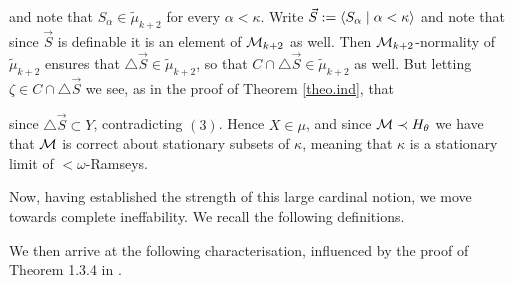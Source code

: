 \documentclass[../../main]{subfiles}
\begin{document}
{	and note that $S_\alpha\in\tilde\mu_{k+2}$ for every $\alpha<\kappa$. Write $\vec S:=\langle S_\alpha\mid\alpha<\kappa\rangle$ and note that since $\vec S$ is definable it is an element of $\operatorname{\mathcal M}_{k+2}$ as well. Then $\operatorname{\mathcal M}_{k+2}$-normality of $\tilde\mu_{k+2}$ ensures that $\triangle\vec S\in\tilde\mu_{k+2}$, so that $C\cap\triangle\vec S\in\tilde\mu_{k+2}$ as well. But letting $\zeta\in C\cap\triangle\vec S$ we see, as in the proof of Theorem \ref{theo.ind}, that

	since $\triangle\vec S\subset Y$, contradicting $(3)$. Hence $X\in\mu$, and since $\operatorname{\mathcal M}\prec H_\theta$ we have that $\operatorname{\mathcal M}$ is correct about stationary subsets of $\kappa$, meaning that $\kappa$ is a stationary limit of ${<}\omega$-Ramseys.
}

Now, having established the strength of this large cardinal notion, we move towards complete ineffability. We recall the following definitions.



We then arrive at the following characterisation, influenced by the proof of Theorem 1.3.4 in \cite{Abramson}.
\end{document}
